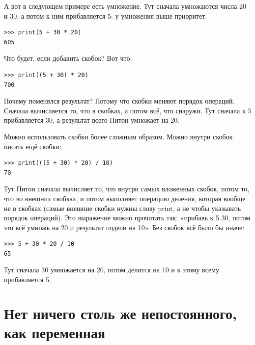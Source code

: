 А вот в следующем примере есть умножение. Тут сначала умножаются числа 20 и 30, а потом к ним прибавляется 5: у умножения выше приоритет.

\begin{listing}
\begin{verbatim}
>>> print(5 + 30 * 20)
605
\end{verbatim}
\end{listing}

Что будет, если добавить скобок? Вот что:

\begin{listing}
\begin{verbatim}
>>> print((5 + 30) * 20)
700
\end{verbatim}
\end{listing}

Почему поменялся результат? Потому что скобки меняют порядок операций. Сначала вычисляется то, что в скобках, а потом всё, что снаружи. Тут сначала к 5 прибавляется 30, а результат всего Питон умножает на 20.

Можно использовать скобки более сложным образом. Можно внутри скобок писать ещё скобки:

\begin{listing}
\begin{verbatim}
>>> print(((5 + 30) * 20) / 10)
70
\end{verbatim}
\end{listing}

Тут Питон сначала вычисляет то, что внутри самых вложенных скобок, потом то, что во внешних скобках, и потом выполняет операцию деления, которая вообще не в скобках (самые внешние скобки нужны слову print, а не чтобы указывать порядок операций). Это выражение можно прочитать так: «прибавь к 5 30, потом это всё умножь на 20 и результат подели на 10». Без скобок всё было бы иначе:

\begin{listing}
\begin{verbatim}
>>> 5 + 30 * 20 / 10
65
\end{verbatim}
\end{listing}

Тут сначала 30 умножается на 20, потом делится на 10 и к этому всему прибавляется 5.


\section{Нет ничего столь же непостоянного, как переменная}

